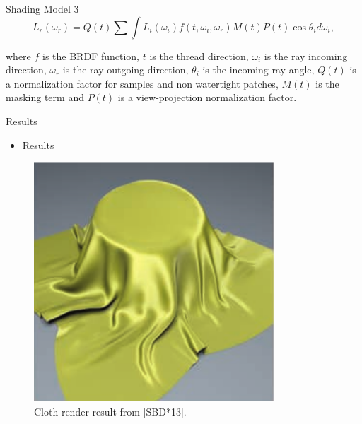 \documentclass{beamer}
\begin{document}
\begin{frame}{Shading Model 3}
\begin{equation*}
L_r(\omega_r) = Q(t) \sum \int L_i(\omega_i) f(t, \omega_i, \omega_r) M(t) P(t) \cos \theta_i d \omega_i,
\end{equation*}

\footnotesize{where $f$ is the BRDF function, $t$ is the thread direction, $\omega_i$ is the ray incoming direction, $\omega_r$ is the ray outgoing direction, $\theta_i$ is the incoming ray angle, $Q(t)$ is a normalization factor for samples and non watertight patches, $M(t)$ is the masking term and $P(t)$ is a view-projection normalization factor.}
\end{frame}

\begin{frame}{Results}
\begin{itemize}
\setlength\itemsep{0.5em}
\item Results
\end{itemize}
\begin{figure}[!htb]
    \centering
    \begin{minipage}{.5\textwidth}
        \centering
        \includegraphics[width=0.8\textwidth]{img/cloth_paper}
        \caption*{Cloth render result from [SBD*13].}
    \end{minipage}%
	\centering
    \begin{minipage}{.5\textwidth}
        \centering
        \movie[width=\textwidth, autostart, loop]

\end{minipage}
\end{figure}
\end{frame}
\end{document}
